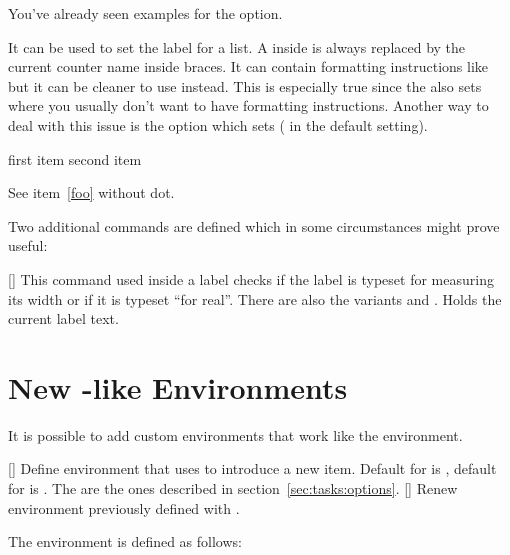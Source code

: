 \documentclass{tasks-manual}
\begin{document}
You've already seen examples for the  option.
\begin{options}
    It can be used to set the label for a list.  A \code{*} inside is always
    replaced by the current counter name inside braces.  It can contain
    formatting instructions like  but it can be cleaner to use
  \Default
    instead.  This is especially true since the  also sets
     where you usually don't want to have formatting
    instructions.  Another way to deal with this issue is the option
  \Default
    which sets  ( in the default setting).
\end{options}

\begin{example}
  \begin{tasks}[label=\arabic*.,ref=\arabic*]
    \task first item
    \task second item \label{foo}
  \end{tasks}
  See item~\ref{foo} without dot.
\end{example}

Two additional commands are defined which in some circumstances might prove
useful:
\begin{commands}
  []
    This command used inside a label checks if the label is
    typeset for measuring its width or if it is typeset \enquote{for
      real}.  There are also the variants  and
    .
    Holds the current label text.
\end{commands}

\section{New -like Environments}
It is possible to add custom environments that work like the 
environment.
\begin{commands}
  []
    Define environment  that uses  to introduce a
    new item.  Default for  is , default for
     is .  The  are the ones described in
    section~\ref{sec:tasks:options}.
  []
    Renew environment previously defined with .
\end{commands}
The  environment is defined as follows:
\begin{sourcecode}
\end{sourcecode}
\end{document}
